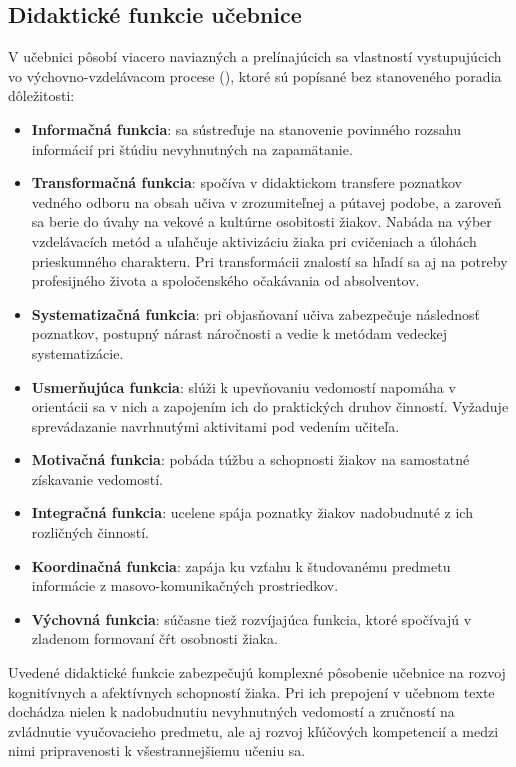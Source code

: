 \subsection{Didaktické funkcie učebnice}
V učebnici pôsobí viacero naviazných a prelínajúcich sa vlastností vystupujúcich vo výchovno-vzdelávacom procese (\cite{zujev_ako_1986}), ktoré sú popísané bez stanoveného poradia dôležitosti:
\begin{itemize}
\itemsep0pt
\item \textbf{Informačná funkcia}: sa sústreďuje na stanovenie povinného rozsahu informácií pri štúdiu nevyhnutných na zapamätanie.
\item \textbf{Transformačná funkcia}: spočíva v didaktickom transfere poznatkov vedného odboru na obsah učiva v zrozumiteľnej a pútavej podobe, a zaroveň sa berie do úvahy na vekové a kultúrne osobitosti žiakov. Nabáda na výber vzdelávacích metód a uľahčuje aktivizáciu žiaka pri cvičeniach a úlohách prieskumného charakteru. Pri transformácii znalostí sa hľadí sa aj na potreby profesijného života a spoločenského očakávania od absolventov.
\item \textbf{Systematizačná funkcia}: pri objasňovaní učiva zabezpečuje následnosť poznatkov, postupný nárast náročnosti a vedie k metódam vedeckej systematizácie.
\item \textbf{Usmerňujúca funkcia}: slúži k upevňovaniu vedomostí napomáha v orientácii sa v nich a zapojením ich do praktických druhov činností. Vyžaduje sprevádazanie navrhnutými aktivitami pod vedením učiteľa.
\item \textbf{Motivačná funkcia}: pobáda túžbu a schopnosti žiakov na samostatné získavanie vedomostí.
\item \textbf{Integračná funkcia}: ucelene spája poznatky žiakov nadobudnuté z ich rozličných činností.
\item \textbf{Koordinačná funkcia}: zapája ku vzťahu k študovanému predmetu informácie z masovo-komunikačných prostriedkov. 
\item \textbf{Výchovná funkcia}: súčasne tiež rozvíjajúca funkcia, ktoré spočívajú v zladenom formovaní čŕt osobnosti žiaka.
\end{itemize}
Uvedené didaktické funkcie zabezpečujú komplexné pôsobenie učebnice na rozvoj kognitívnych a afektívnych schopností žiaka. Pri ich prepojení v učebnom texte dochádza nielen k nadobudnutiu nevyhnutných vedomostí a zručností na zvládnutie vyučovacieho predmetu, ale aj rozvoj kľúčových kompetencií a medzi nimi pripravenosti k všestrannejšiemu učeniu sa.


